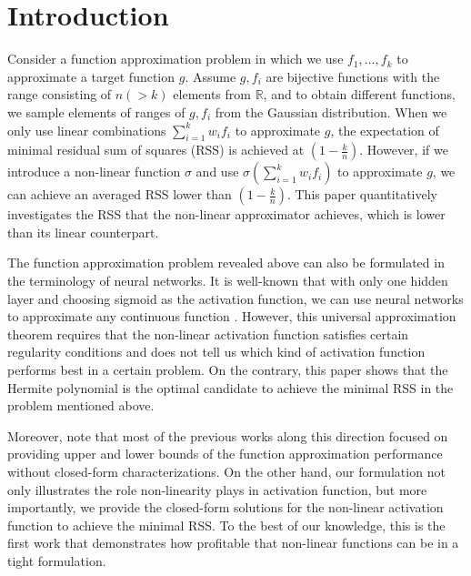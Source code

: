 \documentclass[appliedmath,article,accept,pdftex,moreauthors]{Definitions/mdpi}
\begin{document}


\section{Introduction}
Consider a function approximation problem in which we use $f_1, \dots, f_k$
to approximate a target function $g$.
Assume $g, f_i$ are bijective functions with the range consisting of $n(>k)$ elements
from $\mathbb{R}$,
and to obtain different functions, we sample elements of ranges of $g, f_i$ from the Gaussian distribution.
When we only use linear combinations $\sum_{i=1}^k w_i f_i$
to approximate $g$, 
the expectation of minimal residual sum of squares (RSS)
is achieved at $(1-\frac{k}{n})$.
However, if we introduce a non-linear function $\sigma$ and use
$\sigma(\sum_{i=1}^k w_i f_i)$ to approximate $g$,
we can achieve
an averaged RSS lower than $(1-\frac{k}{n})$. This paper quantitatively investigates
the RSS
that the non-linear
approximator achieves, which is lower than its linear counterpart.

The function approximation problem revealed above can also be formulated in 
the terminology of neural networks.
It is well-known that with only one hidden layer and choosing sigmoid as
the activation function,
we can use neural networks to approximate any continuous function \cite{cybenko1989approximation}.
However, this universal approximation theorem requires that
the non-linear activation function
satisfies certain
regularity conditions
and does not tell us which kind of activation function performs best
in a certain problem. On the contrary, this paper shows that the Hermite polynomial is the optimal
candidate to achieve the minimal RSS in the problem mentioned above.

Moreover, note that most of the previous works along this direction
focused on providing upper and lower bounds \cite{yarotsky2017error}
of the function approximation performance without closed-form characterizations.
On the other hand, our formulation not only illustrates the role non-linearity plays in activation function,
but more importantly, we provide the closed-form solutions for the non-linear activation function to achieve the
minimal RSS.
To the best of our knowledge,
this is the first work that demonstrates how profitable that non-linear functions can be in a tight formulation.
\end{document}
